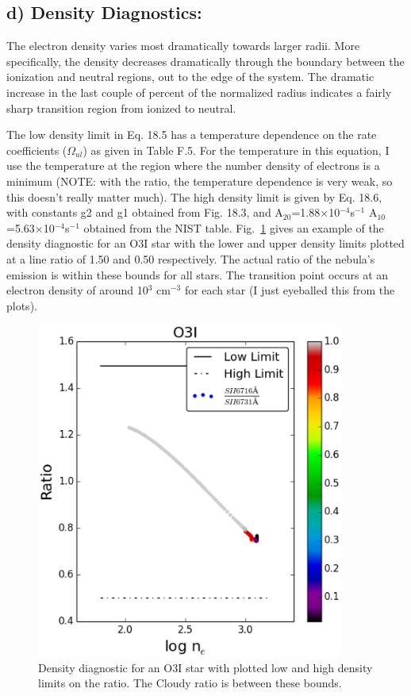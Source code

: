 \documentclass[a4paper]{article}
\begin{document}
\subsection{d) Density Diagnostics:}
The electron density varies most dramatically towards larger radii. More specifically,
the density decreases dramatically through the boundary between the ionization and 
neutral regions, out to the edge of the system. The dramatic increase in the last couple
of percent
of the normalized radius indicates a fairly sharp transition region from ionized
to neutral.

The low density limit in Eq. 18.5 has a temperature dependence on the rate coefficients
($\Omega_{ul}$) as given in Table F.5. For the temperature in this equation, I use
the temperature at the region where the number density of electrons is a minimum
(NOTE: with the ratio, the temperature dependence is very weak, so this doesn't
really matter much). The high density limit is given by Eq. 18.6, with constants
g2 and g1 obtained from Fig. 18.3, and A$_{20}$=1.88$\times$10$^{-4}$s$^{-1}$
A$_{10}$=5.63$\times$10$^{-4}$s$^{-1}$ obtained from the NIST table.
Fig.~\ref{fig:density example} gives an example of the density diagnostic for an O3I
star with the lower and upper density limits plotted at a line ratio of 1.50 and 
0.50 respectively. The actual ratio of the nebula's emission is within these bounds
for all stars. The transition point occurs at an electron density of around 10$^{3}$ cm$^{-3}$
for each star (I just eyeballed this from the plots).

\begin{figure}
\centering
\includegraphics[width=0.9\textwidth]{./figures/DensityDiagnostic.eps}
\caption{Density diagnostic for an O3I star with plotted low and high density
limits on the ratio. The Cloudy ratio is between these bounds.}
\label{fig:density example}
\end{figure}
\end{document}
